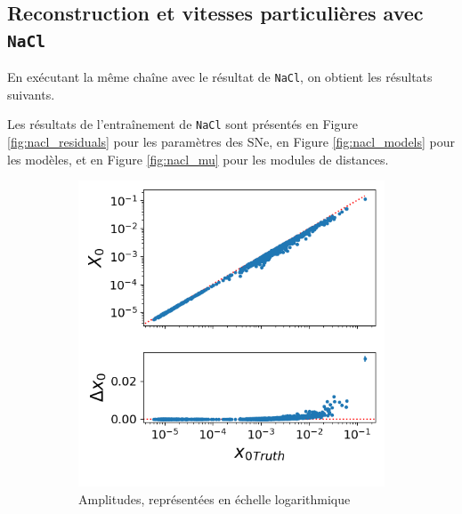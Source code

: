 \documentclass{book}
\def\nacl{\texttt{NaCl}\xspace}
\begin{document}
\subsection{Reconstruction et vitesses particulières avec \nacl}
En exécutant la même chaîne avec le résultat de \nacl, on obtient les résultats suivants.

Les résultats de l'entraînement de \nacl sont présentés en Figure \ref{fig:nacl_residuals} pour les paramètres des SNe, en Figure \ref{fig:nacl_models} pour les modèles, et en Figure \ref{fig:nacl_mu} pour les modules de distances.

\begin{figure}[h]
	\centering
	\begin{subfigure}{0.45\textwidth}
		\centering
		\includegraphics[width=\textwidth]{figures/nacl_x0.png}
		\caption{Amplitudes, représentées en échelle logarithmique}
		\label{fig:nacl_x0}
	\end{subfigure}
	\hfill
	\begin{subfigure}{0.45\textwidth}
		\centering

\end{subfigure}
\end{figure}
\end{document}
